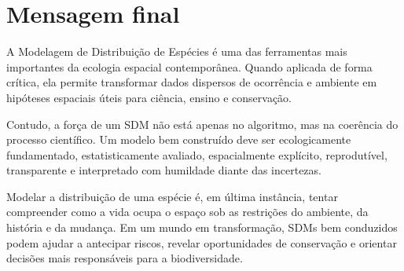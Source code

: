 \section{Mensagem final}

A Modelagem de Distribuição de Espécies é uma das ferramentas mais importantes da ecologia espacial contemporânea. Quando aplicada de forma crítica, ela permite transformar dados dispersos de ocorrência e ambiente em hipóteses espaciais úteis para ciência, ensino e conservação.

Contudo, a força de um SDM não está apenas no algoritmo, mas na coerência do processo científico. Um modelo bem construído deve ser ecologicamente fundamentado, estatisticamente avaliado, espacialmente explícito, reprodutível, transparente e interpretado com humildade diante das incertezas.

\begin{conceito}[title={\faLeaf\quad Consideração final}]
	Modelar a distribuição de uma espécie é, em última instância, tentar compreender como a vida ocupa o espaço sob as restrições do ambiente, da história e da mudança. Em um mundo em transformação, SDMs bem conduzidos podem ajudar a antecipar riscos, revelar oportunidades de conservação e orientar decisões mais responsáveis para a biodiversidade.
\end{conceito}

